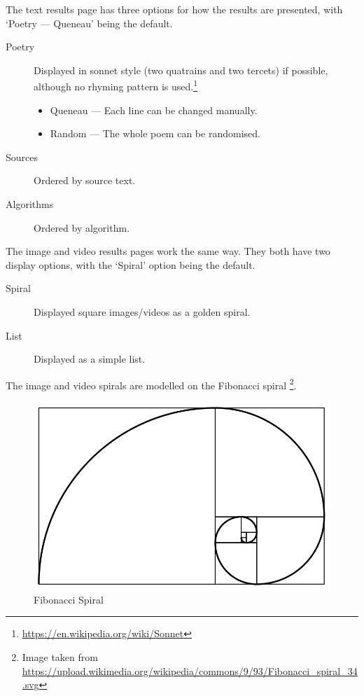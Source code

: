The text results page has three options for how the results are presented, with `Poetry --- Queneau' being the default.
\begin{description}
  \item [Poetry] Displayed in sonnet style (two quatrains and two tercets) if possible, although no rhyming pattern is used.\footnote{\url{https://en.wikipedia.org/wiki/Sonnet}}
    \begin{itemize}
      \item Queneau --- Each line can be changed manually.
      \item Random --- The whole poem can be randomised.
    \end{itemize}
  \item [Sources] Ordered by source text.
  \item [Algorithms] Ordered by algorithm.
\end{description}


The image and video results pages work the same way. They both have two display options, with the `Spiral' option being the default.
\begin{description}
  \item [Spiral] Displayed square images/videos as a golden spiral.
  \item [List] Displayed as a simple list.
\end{description}


The image and video spirals are modelled on the Fibonacci spiral \footnote{Image taken from \url{https://upload.wikimedia.org/wikipedia/commons/9/93/Fibonacci_spiral_34.svg}}.

\begin{figure}[htb] %
  \centering
  \includegraphics[width=\linewidth]{images/Fibonacci}
\caption[Fibonacci Spiral]{Fibonacci Spiral}
\label{img:Fibonacci}
\end{figure}

